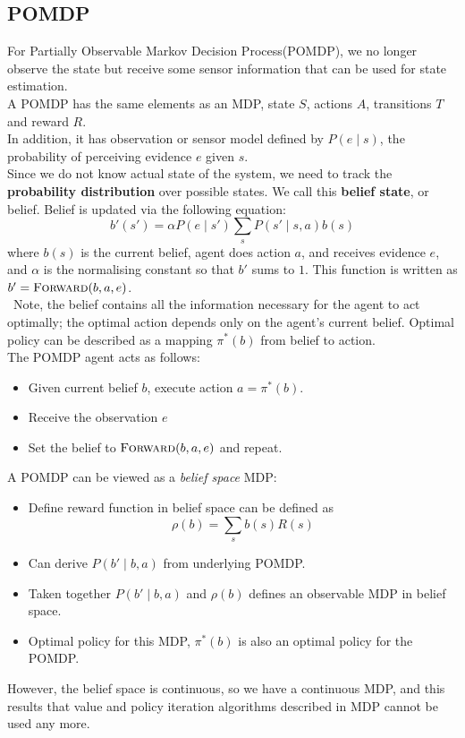 \documentclass[12pt]{article}
\theoremstyle{definition}
\begin{document}
\subsection{POMDP}
For Partially Observable Markov Decision Process(POMDP), we no longer observe the state but receive some sensor information that can be used for state estimation.\\
A POMDP has the same elements as an MDP, state $S$, actions $A$, transitions $T$ and reward $R$.\\
In addition, it has observation or sensor model defined by $P(e\mid s)$, the probability of perceiving evidence $e$ given $s$.\\
Since we do not know actual state of the system, we need to track the \textbf{probability distribution} over possible states. We call this \textbf{belief state}, or belief. Belief is updated via the following equation:
\[
b'(s')=\alpha P(e\mid s')\sum_{s}P(s'\mid s,a)b(s)
\]
where $b(s)$ is the current belief, agent does action $a$, and receives evidence $e$, and $\alpha$ is the normalising constant so that $b'$ sums to $1$. This function is written as $b'=\textsc{Forward}(b,a,e)$.\\\
Note, the belief contains all the information necessary for the agent to act optimally; the optimal action depends only on the agent's current belief. Optimal policy can be described as a mapping $\pi^\ast(b)$ from belief to action.\\
The POMDP agent acts as follows:
\begin{itemize}
	\item Given current belief $b$, execute action $a=\pi^\ast(b)$.
	\item Receive the observation $e$
	\item Set the belief to $\textsc{Forward}(b,a,e)$ and repeat.
\end{itemize}
A POMDP can be viewed as a \textit{belief space} MDP:
\begin{itemize}
	\item Define reward function in belief space can be defined as
	\[
\rho(b)=\sum_s b(s)R(s)
	\]
	\item Can derive $P(b'\mid b,a)$ from underlying POMDP.
	\item Taken together $P(b'\mid b,a)$ and $\rho(b)$ defines an observable MDP in belief space.
	\item Optimal policy for this MDP, $\pi^\ast(b)$ is also an optimal policy for the POMDP.
\end{itemize}
However, the belief space is continuous, so we have a continuous MDP, and this results that value and policy iteration algorithms described in MDP cannot be used any more.
\end{document}
